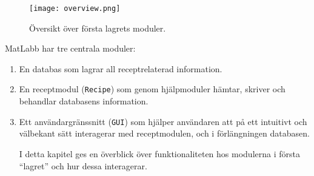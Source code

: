 \begin{figure}[h]
\centering
\texttt{[image: overview.png]}
\caption{Översikt över första lagrets moduler.}
\label{fig:overview}
\end{figure}

MatLabb har tre centrala moduler: 
\begin{enumerate}
\item En databas som lagrar all receptrelaterad information.
\item En receptmodul (\verb=Recipe=) som genom hjälpmoduler hämtar, skriver och behandlar databasens information.
\item Ett användargränssnitt (\verb=GUI=) som hjälper användaren att på ett intuitivt och välbekant sätt interagerar med receptmodulen, och i förlängningen databasen.

I detta kapitel ges en överblick över funktionaliteten hos modulerna i första ``lagret'' och hur dessa interagerar.
\end{enumerate}
